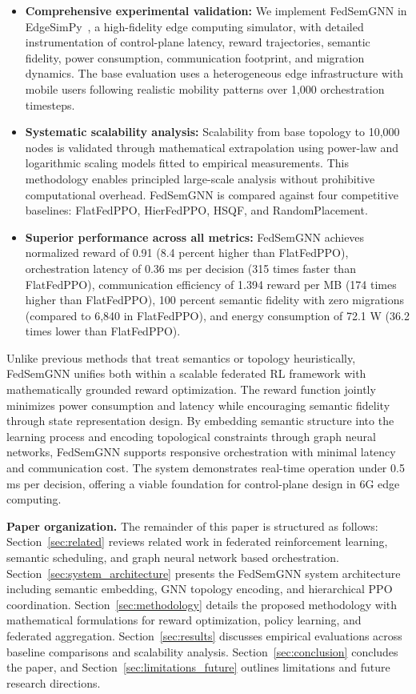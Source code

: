 \begin{itemize}
	\item \textbf{Comprehensive experimental validation:} We implement FedSemGNN in EdgeSimPy~\cite{edgesimpy}, a high-fidelity edge computing simulator, with detailed instrumentation of control-plane latency, reward trajectories, semantic fidelity, power consumption, communication footprint, and migration dynamics. The base evaluation uses a heterogeneous edge infrastructure with mobile users following realistic mobility patterns over 1,000 orchestration timesteps.
	
	\item \textbf{Systematic scalability analysis:} Scalability from base topology to 10,000 nodes is validated through mathematical extrapolation using power-law and logarithmic scaling models fitted to empirical measurements. This methodology enables principled large-scale analysis without prohibitive computational overhead. FedSemGNN is compared against four competitive baselines: FlatFedPPO, HierFedPPO, HSQF, and RandomPlacement.
	
	\item \textbf{Superior performance across all metrics:} FedSemGNN achieves normalized reward of 0.91 (8.4 percent higher than FlatFedPPO), orchestration latency of 0.36 ms per decision (315 times faster than FlatFedPPO), communication efficiency of 1.394 reward per MB (174 times higher than FlatFedPPO), 100 percent semantic fidelity with zero migrations (compared to 6,840 in FlatFedPPO), and energy consumption of 72.1 W (36.2 times lower than FlatFedPPO).
\end{itemize}

Unlike previous methods that treat semantics or topology heuristically, FedSemGNN unifies both within a scalable federated RL framework with mathematically grounded reward optimization. The reward function jointly minimizes power consumption and latency while encouraging semantic fidelity through state representation design. By embedding semantic structure into the learning process and encoding topological constraints through graph neural networks, FedSemGNN supports responsive orchestration with minimal latency and communication cost. The system demonstrates real-time operation under 0.5 ms per decision, offering a viable foundation for control-plane design in 6G edge computing.

\noindent\textbf{Paper organization.} The remainder of this paper is structured as follows: Section~\ref{sec:related} reviews related work in federated reinforcement learning, semantic scheduling, and graph neural network based orchestration. Section~\ref{sec:system_architecture} presents the FedSemGNN system architecture including semantic embedding, GNN topology encoding, and hierarchical PPO coordination. Section~\ref{sec:methodology} details the proposed methodology with mathematical formulations for reward optimization, policy learning, and federated aggregation. Section~\ref{sec:results} discusses empirical evaluations across baseline comparisons and scalability analysis. Section~\ref{sec:conclusion} concludes the paper, and Section~\ref{sec:limitations_future} outlines limitations and future research directions.
